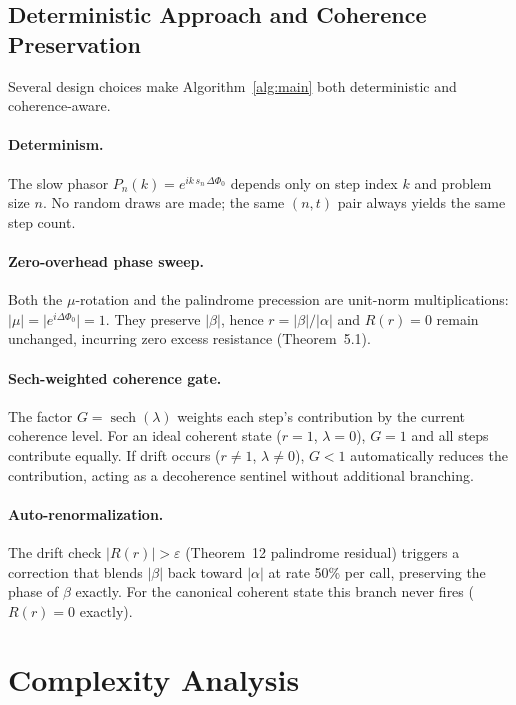 \documentclass[12pt,a4paper]{article}
\theoremstyle{plain}
\theoremstyle{definition}
\theoremstyle{remark}
\newcommand{\abs}[1]{\lvert #1 \rvert}
\begin{document}
\subsection{Deterministic Approach and Coherence Preservation}

Several design choices make Algorithm~\ref{alg:main} both deterministic and
coherence-aware.

\paragraph{Determinism.}
The slow phasor $P_n(k) = e^{ik\,s_n\,\Delta\Phi_0}$ depends only on
step index $k$ and problem size $n$.  No random draws are made; the same
$(n,t)$ pair always yields the same step count.

\paragraph{Zero-overhead phase sweep.}
Both the $\mu$-rotation and the palindrome precession are unit-norm
multiplications: $\abs{\mu}=\abs{e^{i\Delta\Phi_0}}=1$.  They preserve
$\abs{\beta}$, hence $r=\abs{\beta}/\abs{\alpha}$ and $R(r)=0$ remain
unchanged, incurring zero excess resistance (Theorem~5.1).

\paragraph{Sech-weighted coherence gate.}
The factor $G=\operatorname{sech}(\lambda)$ weights each step's contribution
by the current coherence level.  For an ideal coherent state
($r=1$, $\lambda=0$), $G=1$ and all steps contribute equally.  If drift
occurs ($r\ne 1$, $\lambda\ne 0$), $G<1$ automatically reduces the
contribution, acting as a decoherence sentinel without additional branching.

\paragraph{Auto-renormalization.}
The drift check $\abs{R(r)}>\varepsilon$ (Theorem~12 palindrome residual)
triggers a correction that blends $\abs{\beta}$ back toward $\abs{\alpha}$
at rate 50\% per call, preserving the phase of $\beta$ exactly.  For the
canonical coherent state this branch never fires ($R(r)=0$ exactly).

\section{Complexity Analysis}
\label{sec:complexity}
\end{document}
